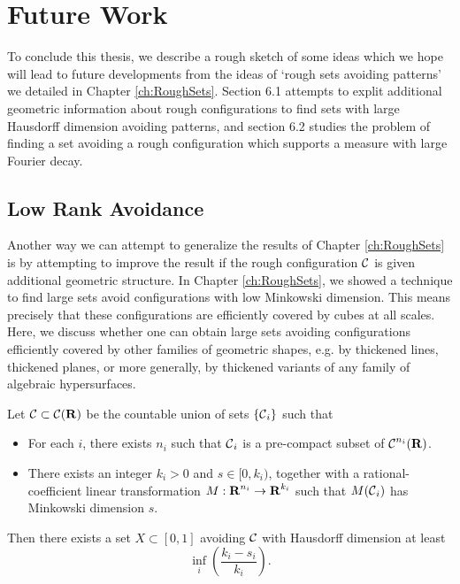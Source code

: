 
\chapter{Future Work}
\label{ch:Conclusions}

To conclude this thesis, we describe a rough sketch of some ideas which we hope will lead to future developments from the ideas of `rough sets avoiding patterns' we detailed in Chapter \ref{ch:RoughSets}. Section 6.1 attempts to explit additional geometric information about rough configurations to find sets with large Hausdorff dimension avoiding patterns, and section 6.2 studies the problem of finding a set avoiding a rough configuration which supports a measure with large Fourier decay.

\section{Low Rank Avoidance}

Another way we can attempt to generalize the results of Chapter \ref{ch:RoughSets} is by attempting to improve the result if the rough configuration $\operatorname{\mathcal{C}}$ is given additional geometric structure. In Chapter \ref{ch:RoughSets}, we showed a technique to find large sets avoid configurations with low Minkowski dimension. This means precisely that these configurations are efficiently covered by cubes at all scales. Here, we discuss whether one can obtain large sets avoiding configurations efficiently covered by other families of geometric shapes, e.g. by thickened lines, thickened planes, or more generally, by thickened variants of any family of algebraic hypersurfaces.

\begin{theorem}
    Let $\operatorname{\mathcal{C}} \subset \operatorname{\mathcal{C}}(\operatorname{\mathbf{R}})$ be the countable union of sets $\{ \operatorname{\mathcal{C}}_i \}$ such that
    \begin{itemize}
        \item For each $i$, there exists $n_i$ such that $\operatorname{\mathcal{C}}_i$ is a pre-compact subset of $\operatorname{\mathcal{C}}^{n_i}(\operatorname{\mathbf{R}})$.

        \item There exists an integer $k_i > 0$ and $s \in [0,k_i)$, together with a rational-coefficient linear transformation $M: \operatorname{\mathbf{R}}^{n_i} \to \operatorname{\mathbf{R}}^{k_i}$ such that $M(\operatorname{\mathcal{C}}_i)$ has Minkowski dimension $s$.
    \end{itemize}
    Then there exists a set $X \subset [0,1]$ avoiding $\operatorname{\mathcal{C}}$ with Hausdorff dimension at least
    \[ \inf_i \left( \frac{k_i - s_i}{k_i} \right). \]
\end{theorem}

